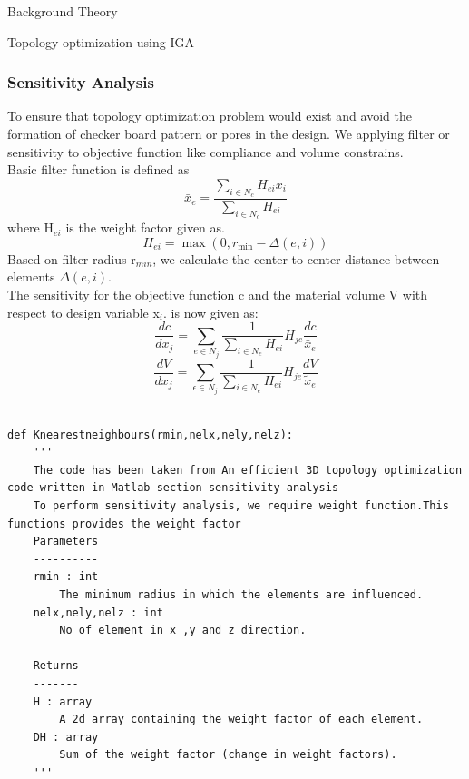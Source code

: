 \documentclass[a4paper,12pt,times]{article}
\begin{document}
\begin{section}{Background Theory}
\begin{subsection}{Topology optimization using IGA}
\subsubsection{Sensitivity Analysis}
To ensure that topology optimization problem would exist and avoid the formation of checker board pattern or pores in the design. We applying filter or sensitivity to objective function like compliance and volume constrains.\\
Basic filter function is defined as
\begin{equation}
\bar{x}_{e}=\frac{\sum_{i \in N_{c}} H_{e i} x_{i}}{\sum_{i \in N_{c}} H_{e i}}
\end{equation}
where H$_{e i}$ is the weight factor given as.
 \begin{equation}
H_{e i}=\max \left(0, r_{\min }-\Delta(e, i)\right)
\end{equation}
Based on filter radius r$_{min}$, we calculate the center-to-center distance between elements $\Delta(e, i)$. \\
The sensitivity for
the objective function c and the material volume V with respect to design variable x$_i$.
is now given as:
\begin{equation}
\frac{d c}{d x_{j}}=\sum_{e \in N_{j}} \frac{1}{\sum_{i \in N_{c}} H_{e i}} H_{j e} \frac{d c}{\bar{x}_{e}}
\end{equation}
\begin{equation}
\frac{d V}{d x_{j}}=\sum_{\epsilon \in N_{j}} \frac{1}{\sum_{i \in N_{e}} H_{e i}} H_{j e} \frac{d V}{\tilde{x}_{e}}
\end{equation}
\begin{lstlisting}

def Knearestneighbours(rmin,nelx,nely,nelz):
    '''
    The code has been taken from An efficient 3D topology optimization code written in Matlab section sensitivity analysis
    To perform sensitivity analysis, we require weight function.This functions provides the weight factor 
    Parameters
    ----------
    rmin : int
        The minimum radius in which the elements are influenced.
    nelx,nely,nelz : int
        No of element in x ,y and z direction.

    Returns
    -------
    H : array
        A 2d array containing the weight factor of each element.
    DH : array
        Sum of the weight factor (change in weight factors).
    '''
\end{lstlisting}

\end{subsection}
\end{section}
\end{document}
